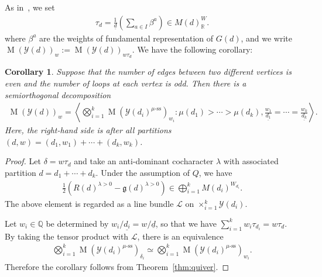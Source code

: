 \documentclass [11pt,oneside,a4paper,mathscr]{amsart}
\newtheorem{cor}[thm]{Corollary}
\theoremstyle{definition}
\newcommand{\Y}{\mathcal{Y}}
\newcommand{\MM}{\operatorname{M}}
\begin{document}
As in~\cite{PTquiver}, we set 
\begin{align*}\tau_d=\frac{1}{\underline{d}}\left(\sum_{a\in I} \beta^a \right)
\in M(d)_{\mathbb{R}}^W.
\end{align*}
where $\beta^a$ are the weights of fundamental representation 
of $G(d)$, 
and we write $\MM(\Y(d))_{w} :=\MM(\Y(d))_{w\tau_d}$. 
We have the following corollary: 
\begin{cor}\label{cor:quiver}
Suppose that the number of edges between two different vertices is even and 
the number of loops at each vertex is odd. 
Then there is a semiorthogonal decomposition 
\begin{align*}
    \MM(\Y(d))_w=\left\langle  \bigotimes_{i=1}^k \MM(\Y(d_i)^{\mu\text{-ss}})_{w_i} :
    \mu(d_1)>\cdots> \mu(d_k), \frac{w_1}{\underline{d_1}}=\cdots=\frac{w_k}{\underline{d_k}} \right\rangle. 
\end{align*}
Here, the right-hand side is after all partitions $(d, w)=(d_1, w_1)+\cdots+(d_k, w_k)$. 
\end{cor}
\begin{proof}
Let $\delta=w\tau_d$ and take an anti-dominant cocharacter $\lambda$ with associated 
partition $d=d_1+\cdots+d_k$. 
    Under the assumption of $Q$, we have 
    \begin{align*}
        \frac{1}{2}(R(d)^{\lambda>0}-\mathfrak{g}(d)^{\lambda>0}) \in \bigoplus_{i=1}^k M(d_i)^{W_{d_i}}.
    \end{align*}
    The above element is regarded as a line bundle $\mathcal{L}$ on 
$\times_{i=1}^k \Y(d_i)$. 

Let $w_i \in \mathbb{Q}$ be determined by $w_i/\underline{d_i}=w/\underline{d}$, so that 
we have $\sum_{i=1}^k w_i \tau_{d_i}=w\tau_d$. 
By taking the tensor product with $\mathcal{L}$, there is an equivalence
\begin{align*}
    \bigotimes_{i=1}^k \MM(\Y(d_i)^{\mu \text{-ss}})_{\delta_i} \simeq 
     \bigotimes_{i=1}^k \MM(\Y(d_i)^{\mu \text{-ss}})_{w_i}.
\end{align*}
Therefore the corollary follows from Theorem~\ref{thm:quiver}. 
\end{proof}
\end{document}
